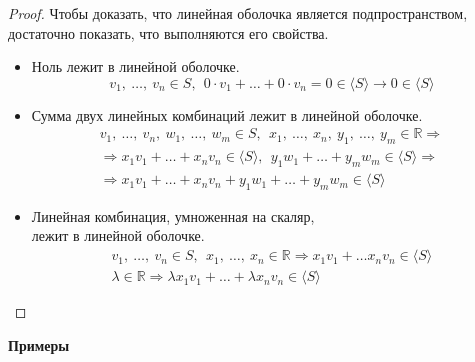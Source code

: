 \documentclass[a4paper,12pt]{article}
\newcommand{\R}{\mathbb{R}}
\begin{document}
	\begin{proof}
		Чтобы доказать, что линейная оболочка является подпространством, достаточно показать, что выполняются его свойства.
		\begin{itemize}
			\item Ноль лежит в линейной оболочке.
			$$v_1,\ \ldots,\ v_n \in S, \ \ 0 \cdot v_1 + \ldots + 0 \cdot v_n = 0 \in \langle S \rangle \rightarrow 0 \in \langle S \rangle
			$$
			\item Сумма двух линейных комбинаций лежит в линейной оболочке.
			\begin{gather*}
			v_1,\ \ldots,\ v_n,\ w_1,\ \ldots,\ w_m \in S, \ \ x_1,\ \ldots,\ x_n,\ y_1,\ \ldots,\ y_m \in \R \Rightarrow \\
			\Rightarrow x_1v_1 + \ldots + x_nv_n \in \langle S \rangle, \ \  y_1w_1 + \ldots + y_mw_m \in \langle S \rangle \Rightarrow \\
			\Rightarrow x_1v_1 + \ldots + x_nv_n + y_1w_1 + \ldots + y_mw_m \in \langle S \rangle
			\end{gather*}
			\item Линейная комбинация, умноженная на скаляр,\\ лежит в линейной оболочке.
			\begin{gather*}
			v_1,\ \ldots,\ v_n \in S, \ \ x_1,\ \ldots,\ x_n \in \R \Rightarrow x_1v_1 + \ldots x_nv_n \in \langle S \rangle \\
			\lambda \in \R \Rightarrow \lambda x_1 v_1 + \ldots + \lambda x_n v_n \in \langle S \rangle
			\end{gather*}
		\end{itemize}
	\end{proof}
	\textbf{Примеры}
\end{document}
